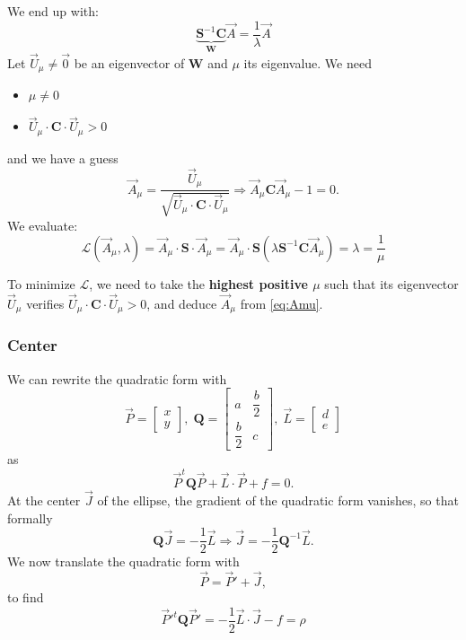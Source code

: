 \documentclass[aps,12pt]{revtex4}
\begin{document}
We end up with:
\begin{equation}
	\underbrace{\bm{S}^{-1} \bm{C}}_{\bm{W}} \vec{A} = \dfrac{1}{\lambda} \vec{A}
\end{equation}
Let $\vec{U}_\mu\not=\vec{0}$ be an eigenvector of $\bm{W}$ and $\mu$ its eigenvalue.
We need
\begin{itemize}
\item $\mu\not=0$
\item $\vec{U}_\mu\cdot\bm{C}\cdot\vec{U}_\mu>0$
\end{itemize}
and we have a guess
\begin{equation}
\label{eq:Amu}
	\vec{A}_\mu = \dfrac{ \vec{U}_\mu}{\sqrt{\vec{U}_\mu\cdot\bm{C}\cdot\vec{U}_\mu}} \Rightarrow \vec{A}_\mu \bm{C} \vec{A}_\mu-1 = 0.
\end{equation}
We evaluate:
\begin{equation}
\mathcal{L}(\vec{A}_\mu,\lambda) = \vec{A}_\mu \cdot \bm{S} \cdot \vec{A}_\mu 
= \vec{A}_\mu \cdot \bm{S} \left( \lambda \bm{S}^{-1} \bm{C} \vec{A}_\mu \right) = \lambda = \dfrac{1}{\mu}
\end{equation}

To minimize $\mathcal{L}$, we need to take the \textbf{highest positive $\mu$} such that its eigenvector $\vec{U}_\mu$ verifies
 $\vec{U}_\mu\cdot\bm{C}\cdot\vec{U}_\mu>0$, and deduce $\vec{A}_\mu$ from \eqref{eq:Amu}.

\subsubsection{Center}
We can rewrite the quadratic form with
\begin{equation}
	\vec{P} = \begin{bmatrix}
		x\\
		y
		\end{bmatrix},
		\;
		\bm{Q} = \begin{bmatrix}
		a & \dfrac{b}{2}\\
		\dfrac{b}{2} & c
		\end{bmatrix},\;
		\vec{L} = \begin{bmatrix}
		d\\
		e
		\end{bmatrix}
\end{equation}
as
\begin{equation}
	\vec{P}^t \bm{Q} \vec{P} + \vec{L}\cdot\vec{P} + f = 0.
\end{equation}
At the center $\vec{J}$ of the ellipse, the gradient of the quadratic form 
vanishes, so that formally
\begin{equation}
	\bm{Q}\vec{J} = -\dfrac{1}{2}\vec{L} \Rightarrow \vec{J} = -\dfrac{1}{2} \bm{Q}^{-1} \vec{L}.
\end{equation}
We now translate the quadratic form with
\begin{equation}
	\vec{P} = \vec{P}' + \vec{J},
\end{equation}
to find
\begin{equation}
	\vec{P}'^t \bm{Q} \vec{P}'= - \dfrac{1}{2} \vec{L}\cdot\vec{J} - f = \rho
\end{equation}
\end{document}
